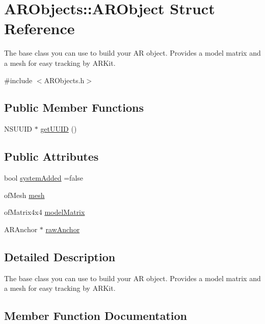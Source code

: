 \hypertarget{struct_a_r_objects_1_1_a_r_object}{}\section{A\+R\+Objects\+:\+:A\+R\+Object Struct Reference}
\label{struct_a_r_objects_1_1_a_r_object}


The base class you can use to build your AR object. Provides a model matrix and a mesh for easy tracking by A\+R\+Kit.  




{\ttfamily \#include $<$A\+R\+Objects.\+h$>$}

\subsection*{Public Member Functions}
\begin{DoxyCompactItemize}
\item 
N\+S\+U\+U\+ID $\ast$ \hyperlink{struct_a_r_objects_1_1_a_r_object_a7b8bd58c0431abebd9cf97a32fc27fab}{get\+U\+U\+ID} ()
\end{DoxyCompactItemize}
\subsection*{Public Attributes}
\begin{DoxyCompactItemize}
\item 
bool \hyperlink{struct_a_r_objects_1_1_a_r_object_abb84b8f934ab23b396cc1904ba5c5569}{system\+Added} =false
\item 
of\+Mesh \hyperlink{struct_a_r_objects_1_1_a_r_object_a32c91c54c8ca0981e234603211372b88}{mesh}
\item 
of\+Matrix4x4 \hyperlink{struct_a_r_objects_1_1_a_r_object_ab77100dc107d550499f7c7fd5403c0ef}{model\+Matrix}
\item 
A\+R\+Anchor $\ast$ \hyperlink{struct_a_r_objects_1_1_a_r_object_a50fb9ac03adddf5d00783c7e10c8e1d8}{raw\+Anchor}
\end{DoxyCompactItemize}


\subsection{Detailed Description}
The base class you can use to build your AR object. Provides a model matrix and a mesh for easy tracking by A\+R\+Kit. 

\subsection{Member Function Documentation}
\mbox{\label{struct_a_r_objects_1_1_a_r_object_a7b8bd58c0431abebd9cf97a32fc27fab}} 
